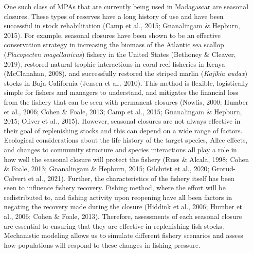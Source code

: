\documentclass[
  12pt,
]{article}
\begin{document}
One such class of MPAs that are currently being used in Madagascar are seasonal closures. These types of reserves have a long history of use and have been successful in stock rehabilitation (Camp et al., 2015; Gnanalingam \& Hepburn, 2015). For example, seasonal closures have been shown to be an effective conservation strategy in increasing the biomass of the Atlantic sea scallop (\emph{Placopecten magellanicus}) fishery in the United States (Bethoney \& Cleaver, 2019), restored natural trophic interactions in coral reef fisheries in Kenya (McClanahan, 2008), and successfully restored the striped marlin (\emph{Kajikia audax}) stocks in Baja California (Jensen et al., 2010). This method is flexible, logistically simple for fishers and managers to understand, and mitigates the financial loss from the fishery that can be seen with permanent closures (Nowlis, 2000; Humber et al., 2006; Cohen \& Foale, 2013; Camp et al., 2015; Gnanalingam \& Hepburn, 2015; Oliver et al., 2015). However, seasonal closures are not always effective in their goal of replenishing stocks and this can depend on a wide range of factors. Ecological considerations about the life history of the target species, Allee effects, and changes to community structure and species interactions all play a role in how well the seasonal closure will protect the fishery (Russ \& Alcala, 1998; Cohen \& Foale, 2013; Gnanalingam \& Hepburn, 2015; Gilchrist et al., 2020; Grorud-Colvert et al., 2021). Further, the characteristics of the fishery itself has been seen to influence fishery recovery. Fishing method, where the effort will be redistributed to, and fishing activity upon reopening have all been factors in negating the recovery made during the closure (Hiddink et al., 2006; Humber et al., 2006; Cohen \& Foale, 2013). Therefore, assessments of each seasonal closure are essential to ensuring that they are effective in replenishing fish stocks. Mechanistic modeling allows us to simulate different fishery scenarios and assess how populations will respond to these changes in fishing pressure.
\end{document}
